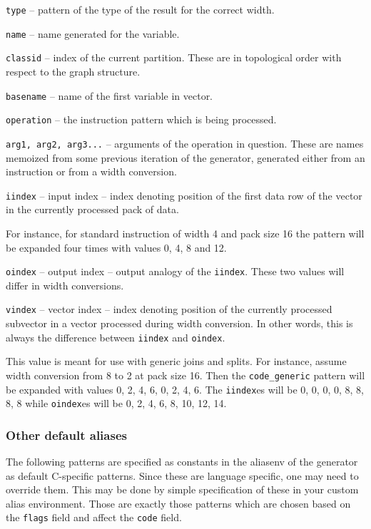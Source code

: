 \begin{description}
\item\texttt{type} -- pattern of the type of the result for the correct width.
\item\texttt{name} -- name generated for the variable.
\item\texttt{classid} -- index of the current partition. These are in topological order with respect to the graph structure.
\item\texttt{basename}  -- name of the first variable in vector. 
\item\texttt{operation} -- the instruction pattern which is being processed.
\item\texttt{arg1, arg2, arg3...} -- arguments of the operation in question. These are names memoized from some previous iteration of the generator, generated either from an instruction or from a width conversion.
\item\texttt{iindex} -- input index -- index denoting position of the first data row of the vector in the currently processed pack of data. 

  For instance, for standard instruction of width 4 and pack size 16 the pattern will be expanded four times with values  0, 4, 8 and 12.

\item\texttt{oindex} -- output index -- output analogy of the \texttt{iindex}. These two values will differ in width conversions.


\item\texttt{vindex} -- vector index -- index denoting position of the currently processed subvector in a vector processed during width conversion. In other words, this is always the difference between \texttt{iindex} and \texttt{oindex}.

This value is meant for use with generic joins and splits. For instance, assume width conversion from 8 to 2 at pack size 16. Then the \texttt{code\_generic} pattern will be expanded with values 0, 2, 4, 6, 0, 2, 4, 6. The \texttt{iindex}es will be 0, 0, 0, 0, 8, 8, 8, 8 while \texttt{oindex}es will be 0, 2, 4, 6, 8, 10, 12, 14.
\end{description}


\subsubsection{Other default aliases}

The following patterns are specified as constants in the aliasenv of the generator as default C-specific patterns. Since these are language specific, one may need to override them. This may be done by simple specification of these in your custom alias environment. Those are exactly those patterns which are chosen based on the \texttt{flags} field and affect the \texttt{code} field.

